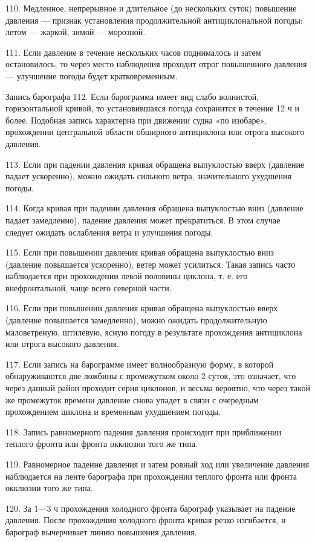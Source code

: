 110. Медленное, непрерывное и длительное (до нескольких суток) повышение давления — признак установления продолжительной антициклональной погоды: летом — жаркой, зимой — морозной.

111. Если давление в течение нескольких часов поднималось и затем остановилось, то через место наблюдения проходит отрог повышенного давления — улучшение погоды будет кратковременным.

Запись барографа
112. Если барограмма имеет вид слабо волнистой, горизонтальной кривой, то установившаяся погода сохранится в течение 12 ч и более. Подобная запись характерна при движении судна «по изобаре», прохождении центральной области обширного антициклона или отрога высокого давления.

113. Если при падении давления кривая обращена выпуклостью вверх (давление падает ускоренно), можно ожидать сильного ветра, значительного ухудшения погоды.

114. Когда кривая при падении давления обращена выпуклостью вниз (давление падает замедленно), падение давления может прекратиться. В этом случае следует ожидать ослабления ветра и улучшения погоды.

115. Если при повышении давления кривая обращена выпуклостью вниз (давление повышается ускоренно), ветер может усилиться. Такая запись часто наблюдается при прохождении левой половины циклона, т. е. его внефронтальной, чаще всего северной части.

116. Если при повышении давления кривая обращена выпуклостью вверх (давление повышается замедленно), можно ожидать продолжительную маловетреную, штилевую, ясную погоду в результате прохождения антициклона или отрога высокого давления.

117. Если запись на барограмме имеет волнообразную форму, в которой обнаруживаются две ложбины с промежутком около 2 суток, это означает, что через данный район проходит серия циклонов, и весьма вероятно, что через такой же промежуток времени давление снова упадет в связи с очередным прохождением циклона и временным ухудшением погоды.

118. Запись равномерного падения давления происходит при приближении теплого фронта или фронта окклюзии того же типа.

119. Равномерное падение давления и затем ровный ход или увеличение давления наблюдается на ленте барографа при прохождении теплого фронта или фронта окклюзии того же типа.

120. За 1—3 ч прохождения холодного фронта барограф указывает на падение давления. После прохождения холодного фронта кривая резко изгибается, и барограф вычерчивает линию повышения давления.

